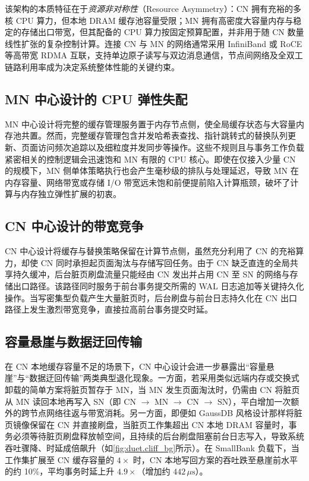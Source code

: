该架构的本质特征在于\emph{资源非对称性}（Resource Asymmetry）：CN 拥有充裕的多核 CPU 算力，但本地 DRAM 缓存池容量受限；MN 拥有高密度大容量内存与稳定的存储出口带宽，但其配备的 CPU 算力按固定预算配置，并非用于随 CN 数量线性扩张的复杂控制计算\cite{goukDirectcxl2022,liPond2023}。连接 CN 与 MN 的网络通常采用 InfiniBand 或 RoCE 等高带宽 RDMA 互联\cite{guoRdma2016,dragojevicFarm2014,kaliaDesign2016}，支持单边原子读写与双边消息通信，节点间网络及全双工链路利用率成为决定系统整体性能的关键约束\cite{binnigEnd2016,zamanianEnd2017}。

\subsection{MN 中心设计的 CPU 弹性失配}
MN 中心设计将完整的缓存管理服务置于内存节点侧，使全局缓存状态与大容量内存池共置\cite{caoPolardb2021,zhangTowards2021,yangPolardb2024}。然而，完整缓存管理包含并发哈希表查找、指针跳转式的替换队列更新、页面访问频次追踪以及细粒度并发同步等操作。这些不规则且与事务工作负载紧密相关的控制逻辑会迅速饱和 MN 有限的 CPU 核心。即使在仅接入少量 CN 的规模下，MN 侧单体策略执行也会产生毫秒级的排队与处理延迟，导致 MN 在内存容量、网络带宽或存储 I/O 带宽远未饱和前便提前陷入计算瓶颈，破坏了计算与内存独立弹性扩展的初衷。

\subsection{CN 中心设计的带宽竞争}
CN 中心设计将缓存与替换策略保留在计算节点侧，虽然充分利用了 CN 的充裕算力，却使 CN 同时承担起页面淘汰与存储写回任务\cite{verbitskiAmazon2017,antonopoulosSocrates2019}。由于 CN 缺乏直连的全局共享持久缓冲，后台脏页刷盘流量只能经由 CN 发出并占用 CN 至 SN 的网络与存储出口路径。该路径同时服务于前台事务提交所需的 WAL 日志追加等关键持久化操作\cite{aguileraRemote2018,grayTransaction1993}。当写密集型负载产生大量脏页时，后台刷盘与前台日志持久化在 CN 出口路径上发生激烈带宽竞争，直接拉高前台事务提交时延。

\subsection{容量悬崖与数据迂回传输}
在 CN 本地缓存容量不足的场景下，CN 中心设计会进一步暴露出“容量悬崖”与“数据迂回传输”两类典型退化现象\cite{zhangTowards2021,ruanPersistent2023}。一方面，若采用类似远端内存或交换式卸载的简单方案将脏页暂存于 MN\cite{guEfficient2017,amaroCan2020}，当 MN 发生页面淘汰时，仍需由 CN 将脏页从 MN 读回本地再写入 SN（即 CN $\rightarrow$ MN $\rightarrow$ CN $\rightarrow$ SN），平白增加一次额外的跨节点网络往返与带宽消耗。另一方面，即便如 GaussDB 风格设计那样将脏页镜像保留在 CN 并直接刷盘\cite{liGaussdb2024}，当脏页工作集超出 CN 本地 DRAM 容量时，事务必须等待脏页刷盘释放帧空间，且持续的后台刷盘阻塞前台日志写入，导致系统吞吐骤降、时延成倍飙升（如\autoref{fig:duet.cliff_bg}所示）。在 SmallBank 负载下，当工作集扩展至 CN 缓存容量的 $4\times$ 时，CN 本地写回方案的吞吐跌至悬崖前水平的约 10\%，平均事务时延上升 $4.9\times$（增加约 $442\,\mu\text{s}$）。

